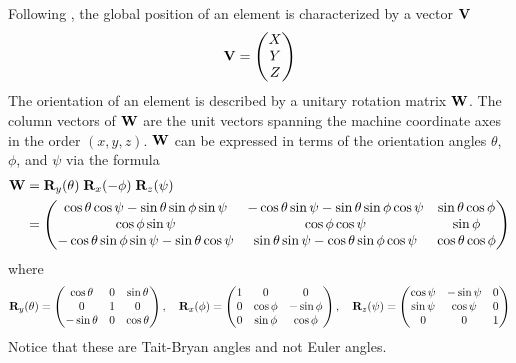 Following \mad, the global position of an element is characterized by a vector ${\bf V}$
\begin{equation}
  {\bf V} = 
  \begin{pmatrix}
    X \\ Y \\ Z 
  \end{pmatrix}
\end{equation}
The orientation of an element is described by a unitary rotation matrix ${\bf W}$. The column vectors
of ${\bf W}$ are the unit vectors spanning the machine coordinate axes in the order $(x, y, z)$. ${\bf W}$
can be expressed in terms of the orientation angles $\theta$, $\phi$, and $\psi$ via the formula
\begin{align}
  {\bf W} &= {\bf R}_{y}(\theta) \; {\bf R}_{x}(-\phi) \; {\bf R}_{z}(\psi) 
  \label{wwww} \\
  &= \begin{pmatrix}
    \cos\theta \cos\psi - \sin\theta \sin\phi \sin\psi & 
        -\cos\theta \sin\psi - \sin\theta \sin\phi \cos\psi & 
         \sin\theta \cos\phi \\
    \cos\phi \sin\psi & \cos\phi \cos\psi & \sin\phi \\
   -\cos\theta \sin\phi \sin\psi - \sin\theta \cos\psi & 
         \sin\theta \sin\psi - \cos\theta \sin\phi \cos\psi & 
         \cos\theta \cos\phi 
  \end{pmatrix}
  \nonumber
\end{align}
where
\begin{equation}
  {\bf R}_{y}(\theta) = 
  \begin{pmatrix}
    \cos\theta  & 0 & \sin\theta \\
    0           & 1 & 0          \\
    -\sin\theta & 0 & \cos\theta 
  \end{pmatrix}, \quad
  {\bf R}_{x}(\phi) = 
  \begin{pmatrix}
    1 & 0 & 0                \\
    0 & \cos\phi & -\sin\phi \\
    0 & \sin\phi &  \cos\phi 
  \end{pmatrix}, \quad
  {\bf R}_{z}(\psi) = 
  \begin{pmatrix}
    \cos\psi & -\sin\psi & 0 \\
    \sin\psi &  \cos\psi & 0 \\
    0        &  0        & 1                
  \end{pmatrix}
  \label{wtt0t}
\end{equation}
Notice that these are Tait-Bryan angles and not Euler angles.

